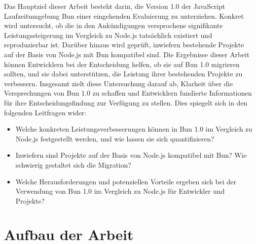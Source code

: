 \noindent
Das Hauptziel dieser Arbeit besteht darin, die Version 1.0 der JavaScript Laufzeitumgebung Bun einer eingehenden Evaluierung zu unterziehen. Konkret wird untersucht, ob die in den Ankündigungen versprochene signifikante Leistungssteigerung im Vergleich zu Node.js tatsächlich existiert und reproduzierbar ist. Darüber hinaus wird geprüft, inwiefern bestehende Projekte auf der Basis von Node.js mit Bun kompatibel sind. Die Ergebnisse dieser Arbeit können Entwicklern bei der Entscheidung helfen, ob sie auf Bun 1.0 migrieren sollten, und sie dabei unterstützen, die Leistung ihrer bestehenden Projekte zu verbessern. Insgesamt zielt diese Untersuchung darauf ab, Klarheit über die Versprechungen von Bun 1.0 zu schaffen und Entwicklern fundierte Informationen für ihre Entscheidungsfindung zur Verfügung zu stellen. Dies spiegelt sich in den folgenden Leitfragen wider:
\begin{itemize}
    \item Welche konkreten Leistungsverbesserungen können in Bun 1.0 im Vergleich zu Node.js festgestellt werden, und wie lassen sie sich quantifizieren?
    \item Inwiefern sind Projekte auf der Basis von Node.js kompatibel mit Bun? Wie schwierig gestaltet sich die Migration?
    \item Welche Herausforderungen und potenziellen Vorteile ergeben sich bei der Verwendung von Bun 1.0 im Vergleich zu Node.js für Entwickler und Projekte?
\end{itemize}

\section{Aufbau der Arbeit}



